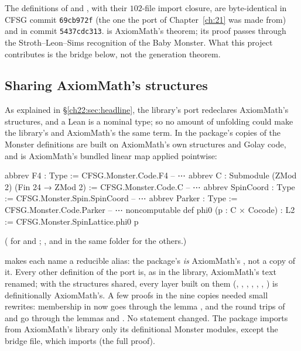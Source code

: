 The definitions of  and , with their $102$-file import closure, are byte-identical in CFSG commit
\texttt{69cb972f} (the one the port of Chapter~\ref{ch:21} was made from) and in commit \texttt{5437cdc313}.
 is AxiomMath's theorem; its proof passes through the Stroth--Leon--Sims recognition of the Baby
Monster.  What this project contributes is the bridge below, not the generation theorem.

\subsection{Sharing AxiomMath's structures}

As explained in \S\ref{ch22:sec:headline}, the library's port redeclares AxiomMath's structures, and a Lean 
is a nominal type; so no amount of unfolding could make the library's  and AxiomMath's  the same term.
In the package's copies of  the Monster definitions are built on AxiomMath's own
structures and Golay code, and  is AxiomMath's bundled linear map applied pointwise:
\begin{leancode}
abbrev F4 : Type := CFSG.Monster.Code.F4
-- ⋯
abbrev C : Submodule (ZMod 2) (Fin 24 → ZMod 2) := CFSG.Monster.Code.C
-- ⋯
abbrev SpinCoord : Type := CFSG.Monster.Spin.SpinCoord
-- ⋯
abbrev Parker : Type := CFSG.Monster.Code.Parker
-- ⋯
noncomputable def phi0 (p : C × Cocode) : L2 := CFSG.Monster.SpinLattice.phi0 p
\end{leancode}
( for  and ;
,  and  in the same folder for the others.)
\begin{dictionary}
 makes each name a reducible alias: the package's  \emph{is} AxiomMath's
, not a copy of it.  Every other definition of the port is, as in the library, AxiomMath's text
renamed; with the structures shared, every layer built on them (, , , ,
, , ) is definitionally AxiomMath's.  A few proofs in the nine copies
needed small rewrites: membership in  now goes through the lemma , and the round trips of
 and  go through the  lemmas  and .  No
statement changed.  The package imports from AxiomMath's library only its definitional Monster modules, except the bridge
file, which imports  (the full proof).
\end{dictionary}

